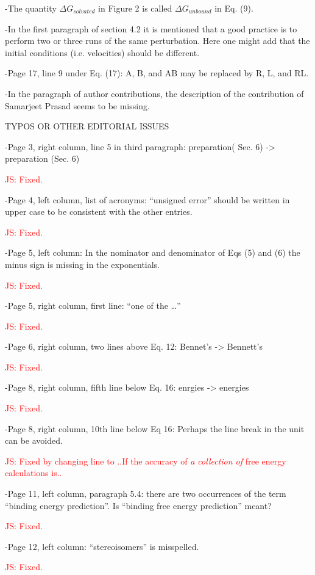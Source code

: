 \documentclass[10pt,stdletter]{newlfm}
\begin{document}
\begin{newlfm}
-The quantity $\Delta G_{solvated}$ in Figure 2 is called $\Delta G_{unbound}$ in Eq. (9).

-In the first paragraph of section 4.2 it is mentioned that a good practice is to perform two or three runs of the same perturbation. Here one might add that the initial conditions (i.e. velocities) should be different.

-Page 17, line 9 under Eq. (17): A, B, and AB may be replaced by R, L, and RL.

-In the paragraph of author contributions, the description of the contribution of Samarjeet Prasad seems to be missing.

TYPOS OR OTHER EDITORIAL ISSUES

-Page 3, right column, line 5 in third paragraph: preparation( Sec. 6) -> preparation (Sec. 6) 

\textcolor{red}{JS: Fixed.}

-Page 4, left column, list of acronyms: “unsigned error” should be written in upper case to be consistent with the other entries.

\textcolor{red}{JS: Fixed.}

-Page 5, left column: In the nominator and denominator of Eqs (5) and (6) the minus sign is missing in the exponentials.

\textcolor{red}{JS: Fixed.}

-Page 5, right column, first line: “one of the …”

\textcolor{red}{JS: Fixed.}

-Page 6, right column, two lines above Eq. 12: Bennet’s -> Bennett’s

\textcolor{red}{JS: Fixed.}

-Page 8, right column, fifth line below Eq. 16: enrgies -> energies

\textcolor{red}{JS: Fixed.}

-Page 8, right column, 10th line below Eq 16: Perhaps the line break in the unit can be avoided.

\textcolor{red}{JS: Fixed by changing line to ..If the accuracy of \textit{a collection of} free energy calculations is..}

-Page 11, left column, paragraph 5.4: there are two occurrences of the term “binding energy prediction”. Is “binding free energy prediction” meant?

\textcolor{red}{JS: Fixed.}

-Page 12, left column: “stereoisomers” is misspelled.

\textcolor{red}{JS: Fixed.}


\end{newlfm}
\end{document}
